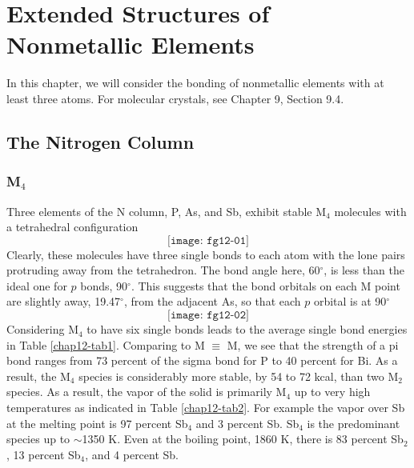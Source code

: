 \chapter{Extended Structures of Nonmetallic Elements}

In this chapter, we will consider the bonding of nonmetallic elements
with at least three atoms.  For molecular crystals, see Chapter 9, 
Section 9.4.

\section{The Nitrogen Column}

\subsection{M$_4$}

Three elements of the N column, P, As, and Sb, exhibit stable M$_4$ molecules 
with a tetrahedral configuration
\begin{equation}
\texttt{[image: fg12-01]}
\end{equation}
Clearly, these molecules have three single bonds to each atom with the lone 
pairs protruding away from the tetrahedron.  The bond angle here, 
60$^{\circ}$, is less than the ideal one for $p$ bonds, 90$^{\circ}$. This
suggests that the bond orbitals on each M point are slightly away, 
19.47$^{\circ}$, from the adjacent As, so
that each $p$ orbital is at 90$^{\circ}$
\begin{equation}
\texttt{[image: fg12-02]}
\end{equation}
Considering M$_4$ to have six single bonds leads to the average single
bond energies in Table \ref{chap12-tab1}.  Comparing to M $\equiv$ M,
we see that the strength of a pi bond ranges from 73 percent of the
sigma bond for P to 40 percent for Bi.  As a result, the M$_4$ species
is considerably more stable, by 54 to 72 kcal, than two M$_2$ species.
As a result, the vapor of the solid is primarily M$_4$ up to very high
temperatures as indicated in Table \ref{chap12-tab2}.  For example the
vapor over Sb at the melting point is 97 percent Sb$_4$ and 3 percent
Sb.  Sb$_4$ is the predominant species up to $\sim$1350 K.  Even at
the boiling point, 1860 K, there is 83 percent Sb$_2$, 13 percent
Sb$_4$, and 4 percent Sb.

